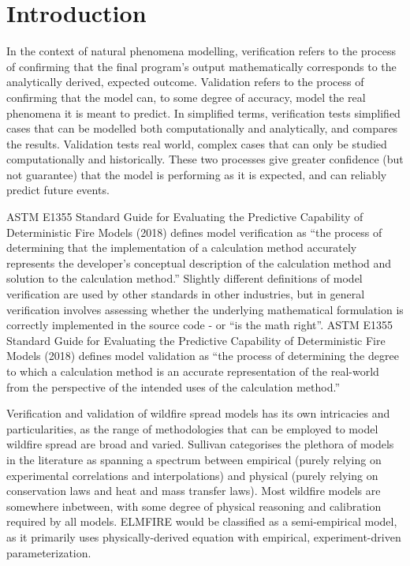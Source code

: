 \section{Introduction}

In the context of natural phenomena modelling, verification refers to the process of confirming that the final program’s output mathematically corresponds to the analytically derived, expected outcome. Validation refers to the process of confirming that the model can, to some degree of accuracy, model the real phenomena it is meant to predict. In simplified terms, verification tests simplified cases that can be modelled both computationally and analytically, and compares the results. Validation tests real world, complex cases that can only be studied computationally and historically. These two processes give greater confidence (but not guarantee) that the model is performing as it is expected, and can reliably predict future events. 

ASTM E1355 Standard Guide for Evaluating the Predictive Capability of Deterministic Fire Models (2018) defines model verification as “the process of determining that the implementation of a calculation method accurately represents the developer’s conceptual description of the calculation method and solution to the calculation method.” Slightly different definitions of model verification are used by other standards in other industries, but in general verification involves assessing whether the underlying mathematical formulation is correctly implemented in the source code - or “is the math right”. ASTM E1355 Standard Guide for Evaluating the Predictive Capability of Deterministic Fire Models (2018) defines model validation as “the process of determining the degree to which a calculation method is an accurate representation of the real-world from the perspective of the intended uses of the calculation method.”

Verification and validation of wildfire spread models has its own intricacies and particularities, as the range of methodologies that can be employed to model wildfire spread are broad and varied. Sullivan categorises the plethora of models in the literature as spanning a spectrum between empirical (purely relying on experimental correlations and interpolations) and physical (purely relying on conservation laws and heat and mass transfer laws). Most wildfire models are somewhere inbetween, with some degree of physical reasoning and calibration required by all models. ELMFIRE would be classified as a semi-empirical model, as it primarily uses physically-derived equation with empirical, experiment-driven parameterization. 

